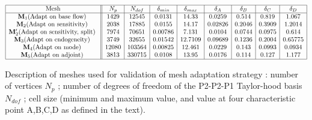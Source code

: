 \documentclass[twocolumn,10pt]{asme2ej}
\begin{document}
\begin{table*}
$$
\begin{array}{|c||c|c|c|c|c|c|c|c|c|}
\hline
\mbox{Mesh} & N_p & N_{dof} & \delta_{min} & \delta_{max} & \delta_A  & \delta_B  & \delta_C  & \delta_D  \\
\hline
\mathbf{M}_1 \mbox{(Adapt on base flow) } & 1429 & 12545	& 0.0131 & 14.33 		& 0.0259 	& 0.514 	& 0.819 	& 1.067 \\   
\mathbf{M}_2 \mbox{(Adapt on sensitivity) } & 2038 & 17885	& 0.0155 & 14.17 		& 0.02826 & 0.2046 	& 0.3909 	& 1.2014 	\\
\mathbf{M}_2' \mbox{(Adapt on sensitivity, split) } & 7974 & 70651	& 0.00786 & 7.131  		& 0.0104 	& 0.0744 	&   0.0975 & 0.614   \\
\mathbf{M}_3 \mbox{(Adapt on endogeneity) } & 3749 & 32655	& 0.01542 & 12.7109  		& 0.09689 	& 0.1236 	&   0.2004 & 0.65775   \\
\mathbf{M}_4 \mbox{(Adapt on mode) } 	& 12080  & 103564		&0.00825	& 12.461		& 0.0229	& 0.143	& 0.0993	& 0.0934 \\
\mathbf{M}_5 \mbox{(Adapt on adjoint) } 	& 3813 	& 330715		& 0.0108	& 13.95		& 0.0176 	& 0.114	& 0.127	& 1.177  \\
\hline
\end{array}
$$
\caption{Description of meshes used for validation of mesh adaptation strategy : number of vertices $N_p$ ; number of degrees of freedom of the P2-P2-P1 Taylor-hood basis $N_{dof}$ ; cell size (minimum and maximum value, and value at four characteristic point A,B,C,D as defined in the text). 
 }
\label{tab:conv1}
\end{table*}
\end{document}
